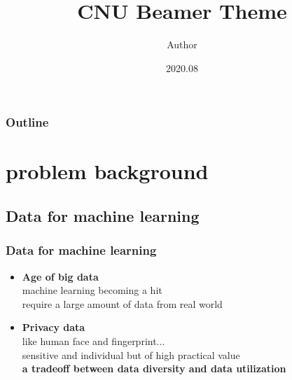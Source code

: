 \documentclass{beamer}
\title{CNU Beamer Theme}
\author{Author}
\institute{University of Science and Technology of China}
\date {2020.08}
\begin{document}
\begin{frame}
\titlepage
\end{frame}



\begin{frame}
	\frametitle{Outline}
  \renewcommand{\contentsname}{目录}
\tableofcontents
\end{frame}
\section{problem background}
\subsection{Data for machine learning}
\begin{frame}
    \frametitle{Data for machine learning}
    \begin{itemize}
        \item \textbf{Age of big data}\\[5pt]
        machine learning becoming a hit\\
        require a large amount of data from real world\\[20pt]
        \item \textbf{Privacy data}\\[5pt]
        like human face and fingerprint...\\
        sensitive and individual but of high practical value\\
        \textbf{a tradeoff between data diversity and data utilization}
    \end{itemize}
\end{frame}
\end{document}
